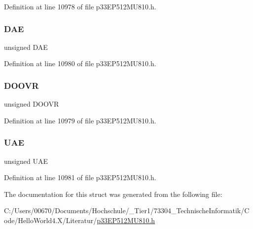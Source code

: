 Definition at line 10978 of file p33\+E\+P512\+M\+U810.\+h.

\mbox{\label{structtag_i_n_t_c_o_n3_b_i_t_s_aec1162551ca60d4d19c47e42894a1c1b}} 
\subsubsection{\texorpdfstring{D\+AE}{DAE}}
{\footnotesize\ttfamily unsigned D\+AE}



Definition at line 10980 of file p33\+E\+P512\+M\+U810.\+h.

\mbox{\label{structtag_i_n_t_c_o_n3_b_i_t_s_ac08ea92557a6100bdfa6e0c8e1842273}} 
\subsubsection{\texorpdfstring{D\+O\+O\+VR}{DOOVR}}
{\footnotesize\ttfamily unsigned D\+O\+O\+VR}



Definition at line 10979 of file p33\+E\+P512\+M\+U810.\+h.

\mbox{\label{structtag_i_n_t_c_o_n3_b_i_t_s_ae86e8a6ab379e697e772868ed37d6443}} 
\subsubsection{\texorpdfstring{U\+AE}{UAE}}
{\footnotesize\ttfamily unsigned U\+AE}



Definition at line 10981 of file p33\+E\+P512\+M\+U810.\+h.



The documentation for this struct was generated from the following file\+:\begin{DoxyCompactItemize}
\item 
C\+:/\+Users/00670/\+Documents/\+Hochschule/\+\_\+\+Tier1/73304\+\_\+\+Technische\+Informatik/\+Code/\+Hello\+World4.\+X/\+Literatur/\hyperlink{p33_e_p512_m_u810_8h}{p33\+E\+P512\+M\+U810.\+h}\end{DoxyCompactItemize}
